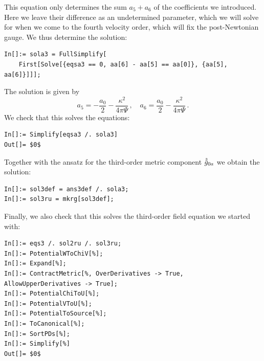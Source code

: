 \documentclass[notitlepage,a4paper,aps,prd,onecolumn,superscriptaddress,nofootinbib,groupedaddress,longbibliography]{revtex4-1}
\newcommand{\order}[2]{\accentset{#2}{#1}}
\begin{document}
This equation only determines the sum \(a_5 + a_6\) of the coefficients we introduced. Here we leave their difference as an undetermined parameter, which we will solve for when we come to the fourth velocity order, which will fix the post-Newtonian gauge. We thus determine the solution:
\begin{lstlisting}
In[]:= sola3 = FullSimplify[
	First[Solve[{eqsa3 == 0, aa[6] - aa[5] == aa[0]}, {aa[5], aa[6]}]]];
\end{lstlisting}
The solution is given by
\begin{equation}
a_5 = -\frac{a_0}{2} - \frac{\kappa^2}{4\pi\Psi}\,, \quad
a_6 = \frac{a_0}{2} - \frac{\kappa^2}{4\pi\Psi}\,.
\end{equation}
We check that this solves the equations:
\begin{lstlisting}
In[]:= Simplify[eqsa3 /. sola3]
Out[]= $0$
\end{lstlisting}
Together with the ansatz for the third-order metric component \(\order{g}{3}_{0a}\) we obtain the solution:
\begin{lstlisting}
In[]:= sol3def = ans3def /. sola3;
In[]:= sol3ru = mkrg[sol3def];
\end{lstlisting}
Finally, we also check that this solves the third-order field equation we started with:
\begin{lstlisting}
In[]:= eqs3 /. sol2ru /. sol3ru;
In[]:= PotentialWToChiV[%];
In[]:= Expand[%];
In[]:= ContractMetric[%, OverDerivatives -> True, AllowUpperDerivatives -> True];
In[]:= PotentialChiToU[%];
In[]:= PotentialVToU[%];
In[]:= PotentialToSource[%];
In[]:= ToCanonical[%];
In[]:= SortPDs[%];
In[]:= Simplify[%]
Out[]= $0$
\end{lstlisting}
\end{document}
